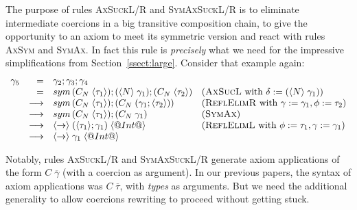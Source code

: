 \documentclass[a4paper,UKenglish]{lipics}
\makeatletter
\def\rulename#1{\textsc{#1}}
\newcommand{\psim}{\mathrel{\sim_{\tiny \#}}}
\def\rulename#1{\textsc{#1}}
\newcommand{\ol}[1]{\overline{#1}}
\newcommand{\sym}[1]{\mathop{sym}\, #1}
\newcommand{\nth}[2]{\mathop{nth} #1\;#2}
\newcommand{\inst}[2]{#1@#2}
\newcommand{\refl}[1]{\langle#1\rangle}  %
\newcommand{\gammas}{\ol{\gamma}}
\newcommand{\taus}{\ol{\tau}}
\makeatother
\begin{document}
The purpose of rules \rulename{AxSuckL/R} and \rulename{SymAxSuckL/R} is to eliminate intermediate coercions in a
big transitive composition chain, to give the opportunity to an axiom to meet its symmetric version and react 
with rules \rulename{AxSym} and \rulename{SymAx}. In fact this rule is {\em precisely} what we need for the 
impressive simplifications from Section~\ref{ssect:large}. Consider that example again:
\[\begin{array}{lrll}
 \gamma_5 & = &  \gamma_2;\gamma_3;\gamma_4 \\
          & = &  \sym{(C_N\;\refl{\tau_1})};(\refl{N}\;\gamma_1);(C_N\;\refl{\tau_2})    & (\rulename{AxSucL} \text{ with } \delta := (\refl{N}\;\gamma_1)) \\
          & \longrightarrow & \sym{(C_N\;\refl{\tau_1})};(C_N\;(\gamma_1;\refl{\tau_2})) & (\rulename{ReflElimR} \text{ with } \gamma := \gamma_1, \phi := \tau_2) \\
          & \longrightarrow & \sym{(C_N\;\refl{\tau_1})};(C_N\;\gamma_1)                 & (\rulename{SymAx}) \\
          & \longrightarrow & \refl{\to}\;(\refl{\tau_1};\gamma_1)\;\refl{@Int@}        & (\rulename{ReflElimL} \text{ with } \phi := \tau_1,\gamma := \gamma_1) \\
          & \longrightarrow & \refl{\to}\;\gamma_1\;\refl{@Int@} 
\end{array}\] 

Notably, rules \rulename{AxSuckL/R} and \rulename{SymAxSuckL/R} generate
axiom applications of the form $C\;\gammas$ (with a coercion as argument).
In our previous papers, the syntax of axiom applications was $C\;\taus$, with \emph{types}
as arguments.  But we need the additional generality to allow coercions rewriting to
proceed without getting stuck.


\end{document}
